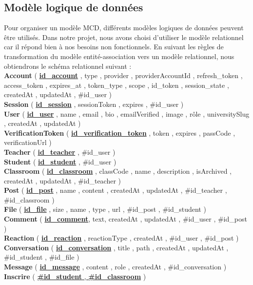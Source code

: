 \subsection{Modèle logique de données}
Pour organiser un modèle MCD, différents modèles logiques de données peuvent être utilisés. Dans notre projet, nous avons choisi d'utiliser le modèle relationnel car il répond bien à nos besoins non fonctionnels. En suivant les règles de transformation du modèle entité-association vers un modèle relationnel, nous obtiendrons le schéma relationnel suivant : \\
\textbf{Account} ( \textbf{\uline{id\_account}} , type , provider , providerAccountId , refresh\_token , access\_token , expires\_at , token\_type , scope , id\_token , session\_state , createdAt , updatedAt , \#id\_user ) \\
\textbf{Session} ( \textbf{\uline{id\_session}} , sessionToken , expires , \#id\_user ) \\ 
\textbf{User} ( \textbf{\uline{id\_user}} , name , email , bio , emailVerified , image , rôle , universitySlug , createdAt , updatedAt ) \\
\textbf{VerificationToken} ( \textbf{\uline{id\_verification\_token}} , token , expires , passCode , verificationUrl ) \\
\textbf{Teacher} ( \textbf{\uline{id\_teacher}} , \#id\_user ) \\
\textbf{Student} ( \textbf{\uline{id\_student}} , \#id\_user ) \\
\textbf{Classroom} ( \textbf{\uline{id\_classroom}} , classCode , name , description , isArchived , createdAt , updatedAt , \#id\_teacher ) \\
\textbf{Post} ( \textbf{\uline{id\_post}} , name , content , createdAt , updatedAt , \#id\_teacher , \#id\_classroom ) \\
\textbf{File} ( \textbf{\uline{id\_file}} , size , name , type , url , \#id\_post , \#id\_student ) \\
\textbf{Comment} ( \textbf{\uline{id\_comment}}, text, createdAt , updatedAt , \#id\_user , \#id\_post ) \\
\textbf{Reaction} ( \textbf{\uline{id\_reaction}} , reactionType , createdAt , \#id\_user , \#id\_post ) \\
\textbf{Conversation} ( \textbf{\uline{id\_conversation}} , title , path , createdAt , updatedAt , \#id\_student , \#id\_file ) \\
\textbf{Message} ( \textbf{\uline{id\_message}} , content , role , createdAt , \#id\_conversation ) \\
\textbf{Inscrire} ( \uline{\textbf{\#id\_student} , \textbf{\#id\_classroom}} )

